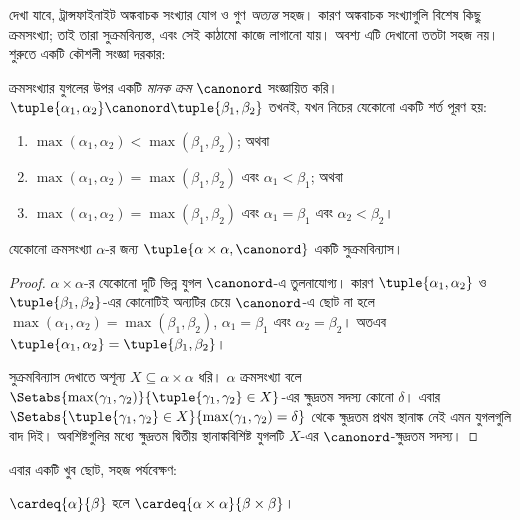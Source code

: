 \documentclass[../../../include/open-logic-section]{subfiles}
\begin{document}


দেখা যাবে, ট্রান্সফাইনাইট অঙ্কবাচক সংখ্যার যোগ ও গুণ
\emph{অত্যন্ত} সহজ। কারণ অঙ্কবাচক সংখ্যাগুলি বিশেষ
কিছু ক্রমসংখ্যা; তাই তারা সুক্রমবিন্যস্ত, এবং সেই
কাঠামো কাজে লাগানো যায়। অবশ্য এটি দেখানো
ততটা সহজ নয়। শুরুতে একটি কৌশলী সংজ্ঞা দরকার:

\begin{defn}
ক্রমসংখ্যার যুগলের উপর একটি \emph{মানক ক্রম}
$\canonord$ সংজ্ঞায়িত করি।
$\tuple{\alpha_1,\alpha_2}\canonord
\tuple{\beta_1,\beta_2}$ তখনই, যখন নিচের
যেকোনো একটি শর্ত পূরণ হয়:
\begin{enumerate}
	\item $\max(\alpha_1, \alpha_2) < \max(\beta_1, \beta_2)$; অথবা
	\item $\max(\alpha_1, \alpha_2) = \max(\beta_1, \beta_2)$ এবং
	$\alpha_1 < \beta_1$; অথবা
	\item $\max(\alpha_1, \alpha_2) = \max(\beta_1, \beta_2)$ এবং
	$\alpha_1 = \beta_1$ এবং $\alpha_2 < \beta_2$।
\end{enumerate}
\end{defn}

\begin{lem}
যেকোনো ক্রমসংখ্যা $\alpha$-র জন্য
$\tuple{\alpha\times\alpha,\canonord}$ একটি সুক্রমবিন্যাস।
\end{lem}

\begin{proof}
$\alpha\times\alpha$-র যেকোনো দুটি ভিন্ন যুগল
$\canonord$-এ তুলনাযোগ্য। কারণ
$\tuple{\alpha_1,\alpha_2}$ ও
$\tuple{\beta_1,\beta_2}$-এর কোনোটিই অন্যটির
চেয়ে $\canonord$-এ ছোট না হলে
$\max(\alpha_1,\alpha_2)=\max(\beta_1,\beta_2)$,
$\alpha_1=\beta_1$ এবং $\alpha_2=\beta_2$।
অতএব $\tuple{\alpha_1,\alpha_2}=
\tuple{\beta_1,\beta_2}$।

সুক্রমবিন্যাস দেখাতে অশূন্য $X\subseteq\alpha\times\alpha$
ধরি। $\alpha$ ক্রমসংখ্যা বলে
$\Setabs{\max(\gamma_1,\gamma_2)}{\tuple{\gamma_1,
\gamma_2}\in X}$-এর ক্ষুদ্রতম সদস্য কোনো
$\delta$। এবার
$\Setabs{\tuple{\gamma_1,\gamma_2}\in X}{\max(\gamma_1,\gamma_2)=
\delta}$ থেকে ক্ষুদ্রতম প্রথম স্থানাঙ্ক নেই এমন
যুগলগুলি বাদ দিই। অবশিষ্টগুলির মধ্যে ক্ষুদ্রতম
দ্বিতীয় স্থানাঙ্কবিশিষ্ট যুগলটি $X$-এর
$\canonord$-ক্ষুদ্রতম সদস্য।
\end{proof}
\noindent
এবার একটি খুব ছোট, সহজ পর্যবেক্ষণ:

\begin{prop}
$\cardeq{\alpha}{\beta}$ হলে
$\cardeq{\alpha\times\alpha}{\beta\times\beta}$।
\end{prop}
\end{document}
